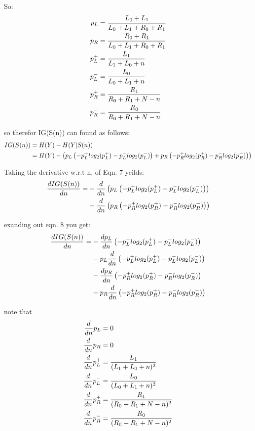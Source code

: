\documentclass[12pt]{article}
\begin{document}
So: 
\begin{align}
    p_L &= \frac{L_0+L_1}{L_0+L_1+R_0+R_1} \notag \\
    p_R &= \frac{R_0+R_1}{L_0+L_1+R_0+R_1} \notag \\
    p_L^+ &= \frac{L_1}{L_1+L_0+n} \notag \\
    p_L^- &= \frac{L_0}{L_0+L_1+n} \notag \\
    p_R^+ &= \frac{R_1}{R_0+R_1+N-n} \notag \\
    p_R^- &= \frac{R_0}{R_0+R_1+N-n}
\end{align}

so therefor IG(S(n)) can found as follows: 
\begin{align}
    IG(S(n)) &= H(Y) - H(Y|S(n)) \\
    &= H(Y) - \left(p_L\left(-p_L^+log_2(p_L^+)-p_L^-log_2(p_L^-)\right)+
    p_R\left(-p_R^+log_2(p_R^+)-p_R^-log_2(p_R^-)\right)\right) \notag
\end{align}

Taking the derivative w.r.t n, of Eqn. 7 yeilds: 
\begin{align}
    \frac{dIG(S(n))}{dn} = & - \frac{d}{dn}\left(p_L\left(-p_L^+log_2(p_L^+)-p_L^-log_2(p_L^-)\right)\right) \notag \\
    & -\frac{d}{dn}\left(p_R\left(-p_R^+log_2(p_R^+)-p_R^-log_2(p_R^-)\right)\right)
\end{align}

exanding out eqn. 8 you get: 
\begin{align}
    \frac{dIG(S(n))}{dn} =& -\frac{dp_L}{dn}\left(-p_L^+log_2(p_L^+)-p_L^-log_2(p_L^-)\right) \notag \\
    &-p_L\frac{d}{dn}\left(-p_L^+log_2(p_L^+)-p_L^-log_2(p_L^-)\right) \notag \\
    &-\frac{dp_R}{dn}\left(-p_R^+log_2(p_R^+)-p_R^-log_2(p_R^-)\right) \notag \\
    &-p_R\frac{d}{dn}\left(-p_R^+log_2(p_R^+)-p_R^-log_2(p_R^-)\right) \notag \\
\end{align}

note that 
\begin{align}
    \frac{d}{dn}p_L &= 0 \notag \\
    \frac{d}{dn}p_R &= 0 \notag \\
    \frac{d}{dn}p_L^+ &= \frac{L_1}{(L_1+L_0+n)^2} \notag \\
    \frac{d}{dn}p_L^- &= \frac{L_0}{(L_0+L_1+n)^2} \notag \\
    \frac{d}{dn}p_R^+ &= \frac{R_1}{(R_0+R_1+N-n)^2} \notag \\
    \frac{d}{dn}p_R^- &= \frac{R_0}{(R_0+R_1+N-n)^2}
\end{align}
\end{document}
